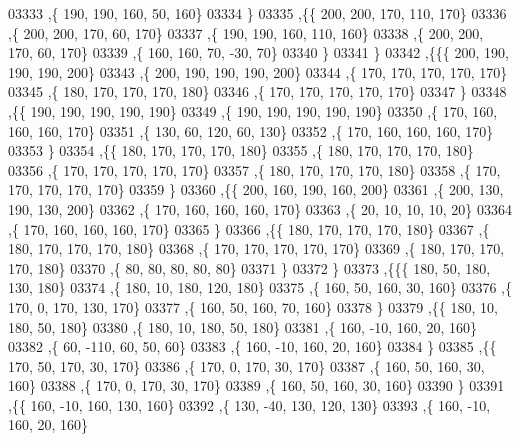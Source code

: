 \begin{DoxyCode}
03333     ,\{   190,   190,   160,    50,   160\}
03334     \}
03335    ,\{\{   200,   200,   170,   110,   170\}
03336     ,\{   200,   200,   170,    60,   170\}
03337     ,\{   190,   190,   160,   110,   160\}
03338     ,\{   200,   200,   170,    60,   170\}
03339     ,\{   160,   160,    70,   -30,    70\}
03340     \}
03341    \}
03342   ,\{\{\{   200,   190,   190,   190,   200\}
03343     ,\{   200,   190,   190,   190,   200\}
03344     ,\{   170,   170,   170,   170,   170\}
03345     ,\{   180,   170,   170,   170,   180\}
03346     ,\{   170,   170,   170,   170,   170\}
03347     \}
03348    ,\{\{   190,   190,   190,   190,   190\}
03349     ,\{   190,   190,   190,   190,   190\}
03350     ,\{   170,   160,   160,   160,   170\}
03351     ,\{   130,    60,   120,    60,   130\}
03352     ,\{   170,   160,   160,   160,   170\}
03353     \}
03354    ,\{\{   180,   170,   170,   170,   180\}
03355     ,\{   180,   170,   170,   170,   180\}
03356     ,\{   170,   170,   170,   170,   170\}
03357     ,\{   180,   170,   170,   170,   180\}
03358     ,\{   170,   170,   170,   170,   170\}
03359     \}
03360    ,\{\{   200,   160,   190,   160,   200\}
03361     ,\{   200,   130,   190,   130,   200\}
03362     ,\{   170,   160,   160,   160,   170\}
03363     ,\{    20,    10,    10,    10,    20\}
03364     ,\{   170,   160,   160,   160,   170\}
03365     \}
03366    ,\{\{   180,   170,   170,   170,   180\}
03367     ,\{   180,   170,   170,   170,   180\}
03368     ,\{   170,   170,   170,   170,   170\}
03369     ,\{   180,   170,   170,   170,   180\}
03370     ,\{    80,    80,    80,    80,    80\}
03371     \}
03372    \}
03373   ,\{\{\{   180,    50,   180,   130,   180\}
03374     ,\{   180,    10,   180,   120,   180\}
03375     ,\{   160,    50,   160,    30,   160\}
03376     ,\{   170,     0,   170,   130,   170\}
03377     ,\{   160,    50,   160,    70,   160\}
03378     \}
03379    ,\{\{   180,    10,   180,    50,   180\}
03380     ,\{   180,    10,   180,    50,   180\}
03381     ,\{   160,   -10,   160,    20,   160\}
03382     ,\{    60,  -110,    60,    50,    60\}
03383     ,\{   160,   -10,   160,    20,   160\}
03384     \}
03385    ,\{\{   170,    50,   170,    30,   170\}
03386     ,\{   170,     0,   170,    30,   170\}
03387     ,\{   160,    50,   160,    30,   160\}
03388     ,\{   170,     0,   170,    30,   170\}
03389     ,\{   160,    50,   160,    30,   160\}
03390     \}
03391    ,\{\{   160,   -10,   160,   130,   160\}
03392     ,\{   130,   -40,   130,   120,   130\}
03393     ,\{   160,   -10,   160,    20,   160\}

\end{DoxyCode}
